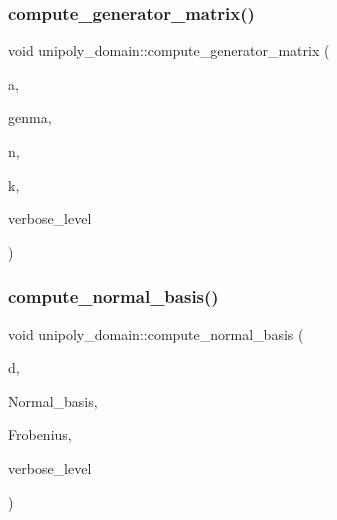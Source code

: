 \subsubsection{\texorpdfstring{compute\+\_\+generator\+\_\+matrix()}{compute\_generator\_matrix()}}
{\footnotesize\ttfamily void unipoly\+\_\+domain\+::compute\+\_\+generator\+\_\+matrix (\begin{DoxyParamCaption}\item[{\mbox{\hyperlink{galois_8h_a77ca58de3d2da6172242493dd9c8aaa8}{unipoly\+\_\+object}}}]{a,  }\item[{\mbox{\hyperlink{galois_8h_a09fddde158a3a20bd2dcadb609de11dc}{I\+NT}} $\ast$\&}]{genma,  }\item[{\mbox{\hyperlink{galois_8h_a09fddde158a3a20bd2dcadb609de11dc}{I\+NT}}}]{n,  }\item[{\mbox{\hyperlink{galois_8h_a09fddde158a3a20bd2dcadb609de11dc}{I\+NT}} \&}]{k,  }\item[{\mbox{\hyperlink{galois_8h_a09fddde158a3a20bd2dcadb609de11dc}{I\+NT}}}]{verbose\+\_\+level }\end{DoxyParamCaption})}

\mbox{\label{classunipoly__domain_a799f3e7de9717b6c0b52dbc5305f3bf5}} 
\subsubsection{\texorpdfstring{compute\+\_\+normal\+\_\+basis()}{compute\_normal\_basis()}}
{\footnotesize\ttfamily void unipoly\+\_\+domain\+::compute\+\_\+normal\+\_\+basis (\begin{DoxyParamCaption}\item[{\mbox{\hyperlink{galois_8h_a09fddde158a3a20bd2dcadb609de11dc}{I\+NT}}}]{d,  }\item[{\mbox{\hyperlink{galois_8h_a09fddde158a3a20bd2dcadb609de11dc}{I\+NT}} $\ast$}]{Normal\+\_\+basis,  }\item[{\mbox{\hyperlink{galois_8h_a09fddde158a3a20bd2dcadb609de11dc}{I\+NT}} $\ast$}]{Frobenius,  }\item[{\mbox{\hyperlink{galois_8h_a09fddde158a3a20bd2dcadb609de11dc}{I\+NT}}}]{verbose\+\_\+level }\end{DoxyParamCaption})}

